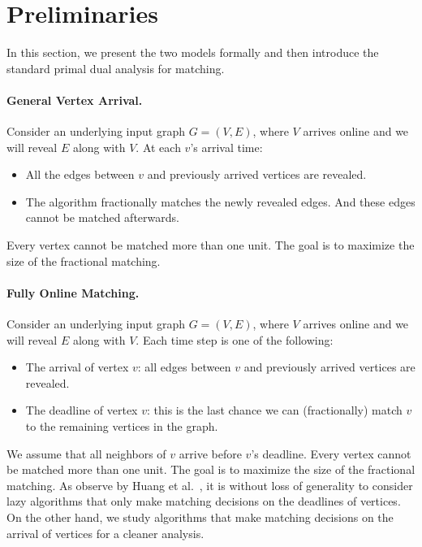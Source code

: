 \section{Preliminaries}
In this section, we present the two models formally and then introduce the standard primal dual analysis for matching.
\paragraph{General Vertex Arrival.}
Consider an underlying input graph $G=(V,E)$, where $V$ arrives online and we will reveal $E$ along with $V$. At each $v$'s arrival time:
\begin{itemize}
    \item All the edges between $v$ and previously arrived vertices are revealed. 
    \item The algorithm fractionally matches the newly revealed edges. And these edges cannot be matched afterwards. 
\end{itemize}
Every vertex cannot be matched more than one unit. The goal is to maximize the size of the fractional matching. 
\paragraph{Fully Online Matching.}
Consider an underlying input graph $G=(V,E)$, where $V$ arrives online and we will reveal $E$ along with $V$. Each time step is one of the following:
\begin{itemize}
    \item The arrival of vertex $v$: all edges between $v$ and previously arrived vertices are revealed. 
    \item The deadline of vertex $v$: this is the last chance we can (fractionally) match $v$ to the remaining vertices in the graph.
\end{itemize}
We assume that all neighbors of $v$ arrive before $v$'s deadline. Every vertex cannot be matched more than one unit. The goal is to maximize the size of the fractional matching. 
As observe by Huang et al.~\cite{jacm/HuangKTWZZ20}, it is without loss of generality to consider lazy algorithms that only make matching decisions on the deadlines of vertices. On the other hand, we study algorithms that make matching decisions on the arrival of vertices for a cleaner analysis.


